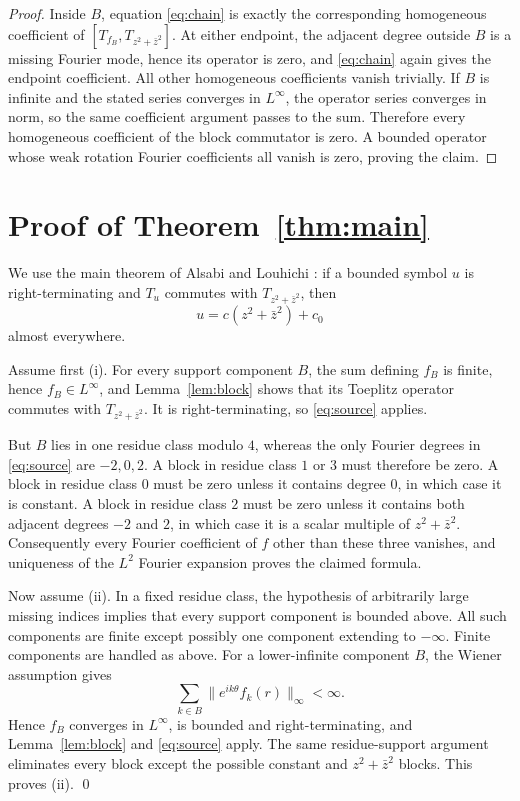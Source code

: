 \documentclass[11pt]{article}
\begin{document}
\begin{proof}
Inside $B$, equation \eqref{eq:chain} is exactly the corresponding
homogeneous coefficient of $[T_{f_B},T_{z^2+\bar z^2}]$.  At either endpoint,
the adjacent degree outside $B$ is a missing Fourier mode, hence its operator
is zero, and \eqref{eq:chain} again gives the endpoint coefficient.  All
other homogeneous coefficients vanish trivially.  If $B$ is infinite and
the stated series converges in $L^\infty$, the operator series converges in
norm, so the same coefficient argument passes to the sum.  Therefore every
homogeneous coefficient of the block commutator is zero.  A bounded operator
whose weak rotation Fourier coefficients all vanish is zero, proving the
claim.
\end{proof}

\section{Proof of Theorem~\ref{thm:main}}

We use the main theorem of Alsabi and Louhichi
\cite[Section~3]{AlsabiLouhichi2017}: if a bounded symbol $u$ is
right-terminating and $T_u$ commutes with $T_{z^2+\bar z^2}$, then
\begin{equation}\label{eq:source}
                         u=c(z^2+\bar z^2)+c_0
\end{equation}
almost everywhere.

Assume first (i).  For every support component $B$, the sum defining $f_B$
is finite, hence $f_B\in L^\infty$, and Lemma~\ref{lem:block} shows that its
Toeplitz operator commutes with $T_{z^2+\bar z^2}$.  It is right-terminating,
so \eqref{eq:source} applies.

But $B$ lies in one residue class modulo $4$, whereas the only Fourier degrees
in \eqref{eq:source} are $-2,0,2$.  A block in residue class $1$ or $3$ must
therefore be zero.  A block in residue class $0$ must be zero unless it
contains degree $0$, in which case it is constant.  A block in residue class
$2$ must be zero unless it contains both adjacent degrees $-2$ and $2$, in
which case it is a scalar multiple of $z^2+\bar z^2$.  Consequently every
Fourier coefficient of $f$ other than these three vanishes, and uniqueness of
the $L^2$ Fourier expansion proves the claimed formula.

Now assume (ii).  In a fixed residue class, the hypothesis of arbitrarily
large missing indices implies that every support component is bounded above.
All such components are finite except possibly one component extending to
$-\infty$.  Finite components are handled as above.  For a lower-infinite
component $B$, the Wiener assumption gives
\[
                  \sum_{k\in B}\|e^{ik\theta}f_k(r)\|_\infty<\infty.
\]
Hence $f_B$ converges in $L^\infty$, is bounded and right-terminating, and
Lemma~\ref{lem:block} and \eqref{eq:source} apply.  The same residue-support
argument eliminates every block except the possible constant and
$z^2+\bar z^2$ blocks.  This proves (ii). \qed
\end{document}
